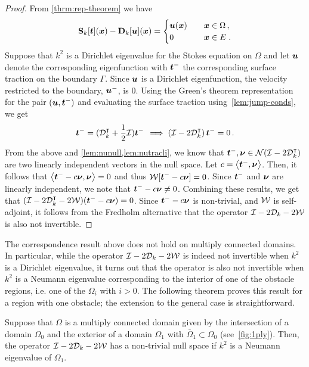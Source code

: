 \begin{proof}
From \cref{thrm:rep-theorem} we have 
  \begin{equation} \label{eq:rep-theorem}
    {\bf S}_{k} [{\boldsymbol t}]({\boldsymbol x}) - {\bf D}_{k}[{\boldsymbol u}]({\boldsymbol x}) = \begin{cases} 
    {\boldsymbol u}({\boldsymbol x}) &\quad {\boldsymbol x} \in \Omega \, , \\
    0 &\quad {\boldsymbol x} \in E \; .
    \end{cases}
  \end{equation}
  Suppose that $k^2$ is a Dirichlet eigenvalue for the Stokes equation
  on $\Omega$ and let ${\boldsymbol u}$ denote the corresponding eigenfunction
  with ${\boldsymbol t}^{-}$ the corresponding surface traction on the
  boundary $\Gamma$.
  Since ${\boldsymbol u}$ is a Dirichlet eigenfunction, the velocity restricted
  to the boundary, ${\boldsymbol u}^{-}$, is $0$. 
  Using the Green's theorem representation for the pair
  $({\boldsymbol u},{\boldsymbol t}^{-})$ and evaluating the surface traction
  using~\cref{lem:jump-conds}, we get
  \begin{equation}
    {\boldsymbol t}^{-} = ({\mathcal D}^{\intercal}_{k} + \frac{1}{2} \mathcal I) {\boldsymbol t}^{-} \,
    \implies \left(\mathcal I - 2{\mathcal D}^{\intercal}_{k} \right) 
    {\boldsymbol t}^{-} = 0 \, .
  \end{equation}
  From the above and \cref{lem:nunull,lem:nutracli},
  we know that ${\boldsymbol t}^{-}, {\boldsymbol \nu} \in {\mathcal N}(\mathcal I - 2{\mathcal D}^{\intercal}_{k})$
  are two linearly independent vectors in the null space.
  Let $c = \left< {\boldsymbol t}^{-},{\boldsymbol \nu} \right>$. Then, it
  follows that $\left<{\boldsymbol t}^{-} -c {\boldsymbol \nu}, {\boldsymbol \nu} \right> = 0$
  and thus ${\mathcal W}[{\boldsymbol t}^{-} - c{\boldsymbol \nu}] = 0$. 
  Since ${\boldsymbol t}^{-}$ and ${\boldsymbol \nu}$ are linearly independent, we note that
  ${\boldsymbol t}^{-} -c{\boldsymbol \nu} \neq 0$. Combining these results, we get that
  $(\mathcal I - 2{\mathcal D}^{\intercal}_{k} - 2{\mathcal W}) ({\boldsymbol t}^{-} - c{\boldsymbol \nu}) = 0$. 
  Since ${\boldsymbol t}^{-}-c{\boldsymbol \nu}$ is non-trivial, and ${\mathcal W}$ is
  self-adjoint, it follows from the Fredholm alternative
  that the operator $\mathcal I - 2{\mathcal D}_{k} - 2{\mathcal W}$ is also not
  invertible.
\end{proof}

The correspondence result above does not hold on multiply
connected domains.
In particular, while the operator $\mathcal I -2{\mathcal D}_{k} -2{\mathcal W}$ 
is indeed not invertible when $k^2$ is a Dirichlet eigenvalue,
it turns out that the operator is also not
invertible when $k^2$ is a Neumann eigenvalue
corresponding to the interior of one of the obstacle regions,
i.e. one of the $\Omega_{i}$ with $i > 0$. The following theorem
proves this result for a region with one obstacle;
the extension to the general case is straightforward.

\begin{thrm}
  Suppose that $\Omega$ is a multiply connected domain
  given by the intersection of a domain $\Omega_{0}$
  and the exterior of a domain $\Omega_{1}$ with
  $ \bar\Omega_1 \subset \Omega_0$
  (see~\cref{fig:1ply}). 
  Then, the operator $\mathcal I - 2{\mathcal D}_{k} - 2{\mathcal W}$ has a non-trivial
  null space if $k^2$ is a Neumann eigenvalue of $\Omega_{1}$.
\end{thrm}

